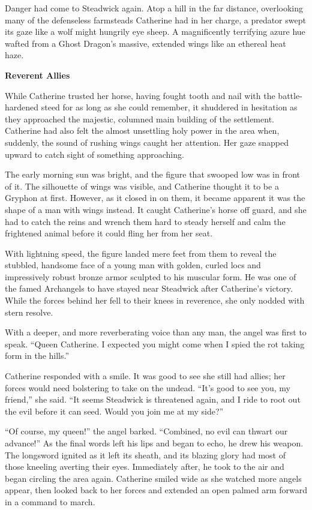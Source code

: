 \begin{multicols*}{2}
Danger had come to Steadwick again.
Atop a hill in the far distance, overlooking many of the defenseless farmsteads Catherine had in her charge, a predator swept its gaze like a wolf might hungrily eye sheep.
A magnificently terrifying azure hue wafted from a Ghost Dragon's massive, extended wings like an ethereal heat haze.

\textbf{Reverent Allies}

While Catherine trusted her horse, having fought tooth and nail with the battle-hardened steed for as long as she could remember, it shuddered in hesitation as they approached the majestic, columned main building of the settlement.
Catherine had also felt the almost unsettling holy power in the area when, suddenly, the sound of rushing wings caught her attention.
Her gaze snapped upward to catch sight of something approaching.

The early morning sun was bright, and the figure that swooped low was in front of it.
The silhouette of wings was visible, and Catherine thought it to be a Gryphon at first.
However, as it closed in on them, it became apparent it was the shape of a man with wings instead.
It caught Catherine's horse off guard, and she had to catch the reins and wrench them hard to steady herself and calm the frightened animal before it could fling her from her seat.

With lightning speed, the figure landed mere feet from them to reveal the stubbled, handsome face of a young man with golden, curled locs and impressively robust bronze armor sculpted to his muscular form.
He was one of the famed Archangels to have stayed near Steadwick after Catherine's victory.
While the forces behind her fell to their knees in reverence, she only nodded with stern resolve.

With a deeper, and more reverberating voice than any man, the angel was first to speak.
``Queen Catherine.
I expected you might come when I spied the rot taking form in the hills.''

Catherine responded with a smile.
It was good to see she still had allies; her forces would need bolstering to take on the undead.
``It's good to see you, my friend,'' she said.
``It seems Steadwick is threatened again, and I ride to root out the evil before it can seed.
Would you join me at my side?''

``Of course, my queen!'' the angel barked.
``Combined, no evil can thwart our advance!'' As the final words left his lips and began to echo, he drew his weapon.
The longsword ignited as it left its sheath, and its blazing glory had most of those kneeling averting their eyes.
Immediately after, he took to the air and began circling the area again.
Catherine smiled wide as she watched more angels appear, then looked back to her forces and extended an open palmed arm forward in a command to march.


\end{multicols*}
